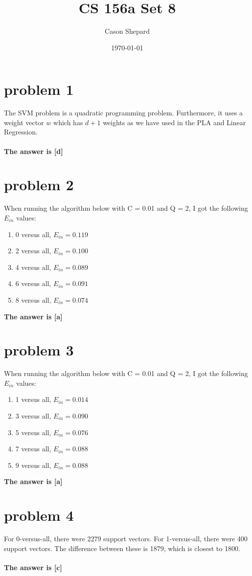 \documentclass{article}
\title{CS 156a Set 8}
\author{Cason Shepard}
\date\today
\begin{document}
\maketitle

\section*{problem 1}
The SVM problem is a quadratic programming problem. Furthermore, it uses a weight vector $w$ which has $d+1$ weights as we have used in the PLA and Linear Regression.\\\\
\textbf{The answer is [d]}

\section*{problem 2}
When running the algorithm below with C = 0.01 and Q = 2, I got the following $E_{in}$ values:
\begin{enumerate}[label=(\alph*)]
    \item 0 versus all, $E_{in} = 0.119$
    \item 2 versus all, $E_{in} = 0.100$
    \item 4 versus all, $E_{in} = 0.089$
    \item 6 versus all, $E_{in} = 0.091$
    \item 8 versus all, $E_{in} = 0.074$
\end{enumerate}
\textbf{The answer is [a]}

\section*{problem 3}
When running the algorithm below with C = 0.01 and Q = 2, I got the following $E_{in}$ values:
\begin{enumerate}[label=(\alph*)]
    \item 1 versus all, $E_{in} = 0.014$
    \item 3 versus all, $E_{in} = 0.090$
    \item 5 versus all, $E_{in} = 0.076$
    \item 7 versus all, $E_{in} = 0.088$
    \item 9 versus all, $E_{in} = 0.088$
\end{enumerate}
\textbf{The answer is [a]}

\section*{problem 4}
For 0-versus-all, there were 2279 support vectors. For 1-versus-all, there were 400 support vectors. The difference between these is 1879, which is closest to 1800.\\\\
\textbf{The answer is [c]}
\end{document}
